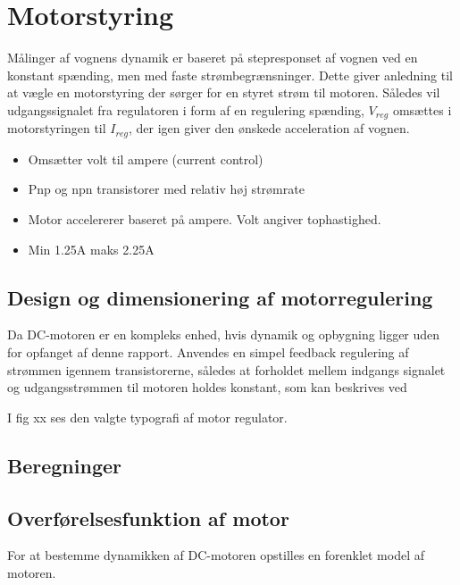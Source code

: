 \section{Motorstyring }\label{sec:sec_motorstyring}
Målinger af vognens dynamik er baseret på stepresponset af vognen ved en konstant spænding, men med faste strømbegrænsninger.
Dette giver anledning til at vægle en motorstyring der sørger for en styret strøm til motoren. 
Således vil udgangssignalet fra regulatoren i form af en regulering spænding, $V_{reg}$ omsættes i motorstyringen til $I_{reg}$, der igen giver den ønskede acceleration af vognen.  

\begin{itemize}
	\item Omsætter volt til ampere (current control)
	\item Pnp og npn transistorer med relativ høj strømrate
	\item Motor accelererer baseret på ampere. Volt angiver tophastighed.
	\item Min 1.25A maks 2.25A
\end{itemize}

\subsection{Design og dimensionering af motorregulering}
Da DC-motoren er en kompleks enhed, hvis dynamik og opbygning ligger uden for opfanget af denne rapport. 
Anvendes en simpel feedback regulering af strømmen igennem transistorerne, således at forholdet mellem indgangs signalet og udgangsstrømmen til motoren holdes konstant, som kan beskrives ved

I fig xx ses den valgte typografi af motor regulator.


\subsection{Beregninger}

\subsection{Overførelsesfunktion af motor}
For at bestemme dynamikken af DC-motoren opstilles en forenklet model af motoren.

